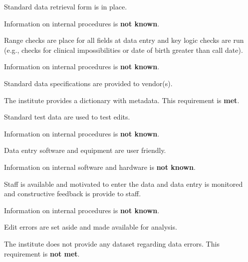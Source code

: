 \begin{QandA}
    \item Standard data retrieval form is in place.
    \begin{answered}
        Information on internal procedures is \textbf{not known}.
    \end{answered}

    \item Range checks are place for all fields at data entry and key logic checks are run (e.g., checks for clinical impossibilities or date of birth greater than call date).
    \begin{answered}
        Information on internal procedures is \textbf{not known}.
    \end{answered}

    \item Standard data specifications are provided to vendor(s).
    \begin{answered}
        The institute provides a dictionary with metadata.
        This requirement is \textbf{met}.
    \end{answered}

    \item Standard test data are used to test edits.
    \begin{answered}
        Information on internal procedures is \textbf{not known}.
    \end{answered}

    \item Data entry software and equipment are user friendly.
    \begin{answered}
        Information on internal software and hardware is \textbf{not known}.
    \end{answered}

    \item Staff is available and motivated to enter the data and data entry is monitored and constructive feedback is provide to staff.
    \begin{answered}
        Information on internal procedures is \textbf{not known}.
    \end{answered}

    \item Edit errors are set aside and made available for analysis.
    \begin{answered}
        The institute does not provide any dataset regarding data errors.
        This requirement is \textbf{not met}.
    \end{answered}


\end{QandA}
